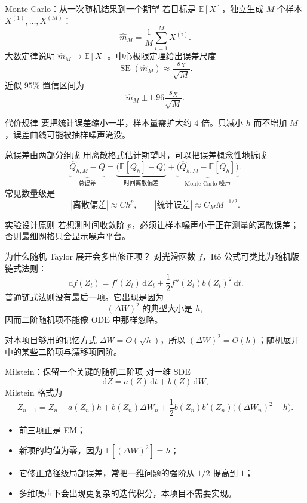 \documentclass[aspectratio=169,10pt,fontset=none]{ctexbeamer}
\newcommand{\E}{\mathbb{E}}
\newcommand{\dd}{\,\mathrm{d}}
\begin{document}
\begin{frame}{Monte Carlo：从一次随机结果到一个期望}
  若目标是 $\E[X]$，独立生成 $M$ 个样本 $X^{(1)},\ldots,X^{(M)}$：
  \[
    \widehat m_M=\frac1M\sum_{i=1}^M X^{(i)}.
  \]
  大数定律说明 $\widehat m_M\to\E[X]$。中心极限定理给出误差尺度
  \[
    \operatorname{SE}(\widehat m_M)\approx\frac{s_X}{\sqrt M}.
  \]
  近似 $95\%$ 置信区间为
  \[
    \boxed{\widehat m_M\pm1.96\frac{s_X}{\sqrt M}}.
  \]
  \begin{alertblock}{代价规律}
    要把统计误差缩小一半，样本量需扩大约 $4$ 倍。只减小 $h$ 而不增加 $M$，误差曲线可能被抽样噪声淹没。
  \end{alertblock}
\end{frame}

\begin{frame}{总误差由两部分组成}
  用离散格式估计期望时，可以把误差概念性地拆成
  \[
    \underbrace{\widehat Q_{h,M}-Q}_{\text{总误差}}
    =
    \underbrace{\bigl(\E[Q_h]-Q\bigr)}_{\text{时间离散偏差}}
    +
    \underbrace{\bigl(\widehat Q_{h,M}-\E[Q_h]\bigr)}_{\text{Monte Carlo 噪声}}.
  \]
  常见数量级是
  \[
    |\text{离散偏差}|\approx Ch^p,
    \qquad
    |\text{统计误差}|\approx C_M M^{-1/2}.
  \]
  \begin{block}{实验设计原则}
    若想测时间收敛阶 $p$，必须让样本噪声小于正在测量的离散误差；否则最细网格只会显示噪声平台。
  \end{block}
\end{frame}

\begin{frame}{为什么随机 Taylor 展开会多出修正项？}
  对光滑函数 $f$，It\^o 公式可类比为随机版链式法则：
  \[
    \dd f(Z_t)
      =f'(Z_t)\dd Z_t+\frac12f''(Z_t)b(Z_t)^2\dd t.
  \]
  普通链式法则没有最后一项。它出现是因为
  \[
    (\Delta W)^2\text{ 的典型大小是 }h,
  \]
  因而二阶随机项不能像 ODE 中那样忽略。
  \begin{block}{对本项目够用的记忆方式}
    $\Delta W=O(\sqrt h)$，所以 $(\Delta W)^2=O(h)$；随机展开中的某些二阶项与漂移项同阶。
  \end{block}
\end{frame}

\begin{frame}{Milstein：保留一个关键的随机二阶项}
  对一维 SDE
  \[
    \dd Z=a(Z)\dd t+b(Z)\dd W,
  \]
  Milstein 格式为
  \[
    \boxed{
    Z_{n+1}=Z_n+a(Z_n)h+b(Z_n)\Delta W_n
    +\frac12 b(Z_n)b'(Z_n)\bigl((\Delta W_n)^2-h\bigr)}.
  \]
  \begin{itemize}
    \item 前三项正是 EM；
    \item 新项的均值为零，因为 $\E[(\Delta W)^2]=h$；
    \item 它修正路径级局部误差，常把一维问题的强阶从 $1/2$ 提高到 $1$；
    \item 多维噪声下会出现更复杂的迭代积分，本项目不需要实现。
  \end{itemize}
\end{frame}
\end{document}
